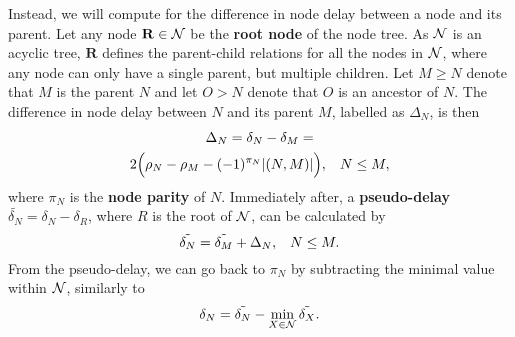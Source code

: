 Instead, we will compute for the difference in node delay between a node and its parent. Let any node $\mathbf{R}\in\mathcal{N}$ be the \textbf{root node} of the node tree. As $\mathcal{N}$ is an acyclic tree, $\mathbf{R}$ defines the parent-child relations for all the nodes in $\mathcal{N}$, where any node can only have a single parent, but multiple children. Let $M\geq N$ denote that $M$ is the parent $N$ and let $O > N$ denote that $O$ is an ancestor of $N$. The difference in node delay between $N$ and its parent $M$, labelled as $\Delta_N$, is then
\begin{multline}\label{eq:pmwdif}
    \Delta_N = \delta_N - \delta_M = \\
    2\Big(\rho_N-\rho_M - (-1)^{\pi_N}\lvert(N,M)\rvert\Big), \hspace{.3cm} N\leq M,
\end{multline}
where $\pi_N$ is the \textbf{node parity} of $N$. Immediately after, a \textbf{pseudo-delay} $\tilde{\delta_N} = \delta_N - \delta_R$, where $R$ is the root of $\mathcal{N}$, can be calculated by
\begin{equation}\label{eq:pseudodelay}
    \tilde{\delta_N} = \tilde{\delta_M} + \Delta_N, \hspace{.3cm} N\leq M.
\end{equation}
From the pseudo-delay, we can go back to $\pi_N$ by subtracting the minimal value within $\mathcal{N}$, similarly to 
\begin{equation}\label{eq:delaypseudo}
    \delta_N = \tilde{\delta_N} - \min_{X \in \mathcal{N}}{\tilde{\delta_X}}. 
\end{equation}

